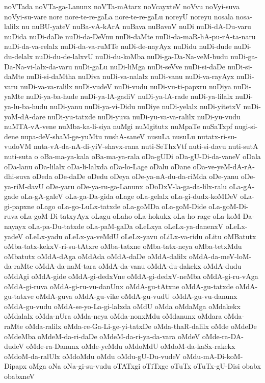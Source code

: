 {noVTada
noVTa-ga-Lanunx
noVTa-mAtarx
noVcayxteV
noVvu
noVyi-suva
noVyi-su-vare
nore
nore-te-re-gaLa
nore-te-re-gaLu
noreyU
noreyu
nosala
nosa-lalilx
nu
nuBU-yateV
nuBa-vA-kArA
nuBava
nuBavoV
nuDi
nuDi-dA-Du-varu
nuDida
nuDi-daDe
nuDi-da-DeVnu
nuDi-daMte
nuDi-da-maR-hA-pu-rA-ta-naru
nuDi-da-va-relalx
nuDi-da-va-ruMTe
nuDi-de-nayAyx
nuDidu
nuDi-dude
nuDi-du-delalx
nuDi-du-de-lalxvU
nuDi-du-koMba
nuDi-ga-Da-Na-veM-budu
nuDi-ga-Da-Na-vi-lalx-da-varu
nuDi-gaLu
nuDi-liMga
nuDi-seVve
nuDi-si-daDe
nuDi-si-daMte
nuDi-si-daMtha
nuDiva
nuDi-va-nalalx
nuDi-vanu
nuDi-va-rayAyx
nuDi-varu
nuDi-va-va-ralilx
nuDi-vudeV
nuDi-vudu
nuDi-vu-ti-papxru
nuDiya
nuDi-yaMte
nuDi-ya-ba-hude
nuDi-ya-lA-gadiV
nuDi-ya-lA-rade
nuDi-ya-lilalx
nuDi-ya-lu-ba-hudu
nuDi-yanu
nuDi-ya-vi-Didu
nuDiye
nuDi-yelalx
nuDi-yitetxV
nuDi-yoM-dA-dare
nuDi-yu-tatxde
nuDi-yuva
nuDi-yu-va-va-ralilx
nuDi-yu-vudu
nuMTA-vA-vene
nuMba-ka-li-siya
nuMgi
nuMgitutx
nuMpaTe
nuSaTxpf
nugi-si-dene
nupa-deV-shaM-ge-yuMtu
nushA-saneV
nusuLa
nusuLu
nutatx-ri-su-vudoVM
nuta-vA-da-nA-di-yiV-shavx-rana
nuti-SeThxVtf
nuti-si-davu
nuti-sutA
nuti-suta
o
oBa-ma-ya-kala
oBa-ma-ya-rala
oDa-gUDi
oDa-gU-Di-da-vaneV
oDala
oDa-lanu
oDa-lilalx
oDa-li-lalxda
oDa-lo-Lage
oDalu
oDane
oDa-ve-yeM-dA-rA-dhi-suva
oDeda
oDe-daDe
oDedu
oDeya
oDe-ya-nA-du-da-riMda
oDe-yanu
oDe-ya-riM-davU
oDe-yaru
oDe-ya-ru-ga-Lanunx
oDoDxV-la-ga-da-lilx-ralu
oLa-gA-gade
oLa-gA-galeV
oLa-ga-Da-gida
oLage
oLa-gelalx
oLa-gi-dudx-koMDeV
oLa-gi-papxne
oLago
oLa-go-LuLx-tatxde
oLa-goMDa
oLa-goM-Dide
oLa-goM-Di-ruva
oLa-goM-Di-tatxyAyx
oLagu
oLaho
oLa-hokukx
oLa-ho-rage
oLa-koM-Da-nayayx
oLa-pa-Du-tatxde
oLa-paM-gaDa
oLeLxya
oLeLx-ya-danenxV
oLeLx-yadeV
oLeLx-yadu
oLeLx-ya-veMdU
oLeLx-yavu
oLiLx-va-ridu
oLitu
oMBatutx
oMba-tatx-kekxV-ri-su-tAtxre
oMba-tatxne
oMba-tatx-neya
oMba-tetxMdu
oMbatutx
oMdA-dAga
oMdAda
oMdA-daDe
oMdA-dalilx
oMdA-da-meV-loM-da-raMte
oMdA-da-naM-tara
oMdA-da-vanu
oMdA-du-dakekx
oMdA-dudu
oMdAgi
oMdA-gide
oMdA-gi-dedxVne
oMdA-gi-dedxV-neMba
oMdA-gi-ru-vAga
oMdA-gi-ruva
oMdA-gi-ru-vu-danUnx
oMdA-gu-tAtxne
oMdA-gu-tatxde
oMdA-gu-tatxve
oMdA-guva
oMdA-gu-vike
oMdA-gu-vudU
oMdA-gu-vu-danunx
oMdA-gu-vudu
oMdA-se-yo-La-gi-lalxda
oMdU
oMda
oMdaMga
oMdakekx
oMdalalx
oMda-nUra
oMda-neya
oMda-nonxMdu
oMdanunx
oMdara
oMda-raMte
oMda-ralilx
oMda-re-Ga-Li-ge-yi-tatxDe
oMda-thaR-dalilx
oMde
oMdeDe
oMdeMba
oMdeM-da-ri-daDe
oMdeM-da-ri-ya-da-vara
oMdeV
oMde-ra-DA-dudeV
oMde-ra-Danunx
oMde-yeMdu
oMdoMdU
oMdoM-da-kaSx-rakekx
oMdoM-da-ralUlx
oMdoMdu
oMdu
oMdu-gU-Du-vudeV
oMdu-mA-Di-koM-Dipapx
oMga
oNa
oNa-gi-su-vudu
oTATxgi
oTiTxge
oTuTx
oTuTx-gU-Disi
obabx
obabxneV
}

